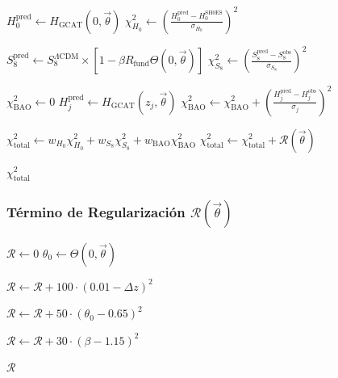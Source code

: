 \documentclass[12pt, a4paper]{article}
\theoremstyle{plain}
\theoremstyle{definition}
\begin{document}
\begin{algorithmic}[1]
    \STATE $H_0^{\text{pred}} \gets H_{\text{GCAT}}(0, \vec{\theta})$
    \STATE $\chi^2_{H_0} \gets \left(\frac{H_0^{\text{pred}} - H_0^{\text{SH0ES}}}{\sigma_{H_0}}\right)^2$
    
    \STATE $S_8^{\text{pred}} \gets S_8^{\Lambda\text{CDM}} \times [1 - \beta R_{\text{fund}} \Theta(0, \vec{\theta})]$
    \STATE $\chi^2_{S_8} \gets \left(\frac{S_8^{\text{pred}} - S_8^{\text{obs}}}{\sigma_{S_8}}\right)^2$
    
    \STATE $\chi^2_{\text{BAO}} \gets 0$
        \STATE $H_j^{\text{pred}} \gets H_{\text{GCAT}}(z_j, \vec{\theta})$
        \STATE $\chi^2_{\text{BAO}} \gets \chi^2_{\text{BAO}} + \left(\frac{H_j^{\text{pred}} - H_j^{\text{obs}}}{\sigma_j}\right)^2$
    \ENDFOR
    
    \STATE $\chi^2_{\text{total}} \gets w_{H_0}\chi^2_{H_0} + w_{S_8}\chi^2_{S_8} + w_{\text{BAO}}\chi^2_{\text{BAO}}$
    \STATE $\chi^2_{\text{total}} \gets \chi^2_{\text{total}} + \mathcal{R}(\vec{\theta})$ 
    
    \RETURN $\chi^2_{\text{total}}$
\ENDFUNCTION
\end{algorithmic}

\subsubsection{Término de Regularización $\mathcal{R}(\vec{\theta})$}

\begin{algorithmic}[1]
    \STATE $\mathcal{R} \gets 0$
    \STATE $\theta_0 \gets \Theta(0, \vec{\theta})$
    
     
        \STATE $\mathcal{R} \gets \mathcal{R} + 100 \cdot (0.01 - \Delta z)^2$
    \ENDIF
    
     
        \STATE $\mathcal{R} \gets \mathcal{R} + 50 \cdot (\theta_0 - 0.65)^2$
    \ENDIF
    
     
        \STATE $\mathcal{R} \gets \mathcal{R} + 30 \cdot (\beta - 1.15)^2$
    \ENDIF
    
    \RETURN $\mathcal{R}$
\ENDFUNCTION
\end{algorithmic}
\end{document}
